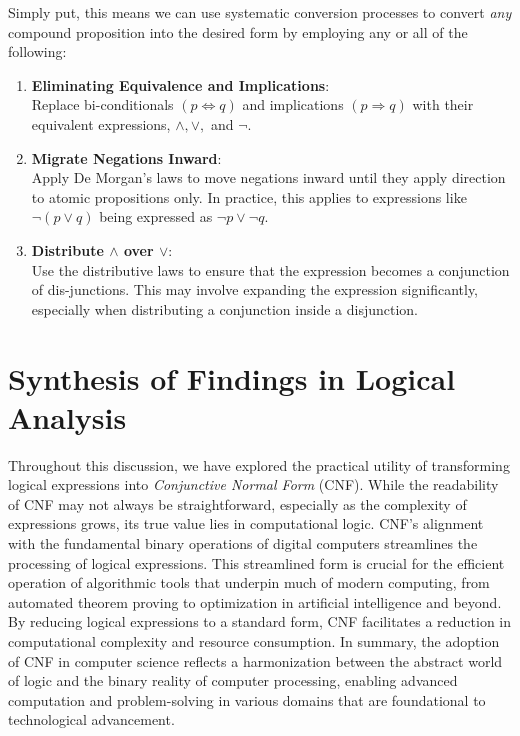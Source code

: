 \documentclass{article}
\begin{document}
            \noindent Simply put, this means we can use systematic conversion processes to convert \textit{any} compound proposition into the desired form by employing any or all of the following: 
            \begin{enumerate}
                \item \textbf{Eliminating Equivalence and Implications}: \\
                Replace bi-conditionals $(p\iff q)$ and implications $(p\Rightarrow q)$ with their equivalent expressions, $\land, \lor,$ and $\neg$. 
                \item \textbf{Migrate Negations Inward}: \\
                Apply De Morgan's laws to move negations inward until they apply direction to atomic propositions only. In practice, this applies to expressions like $\neg(p \lor q)$ being expressed as $\neg p \lor \neg q$. 
                \item \textbf{Distribute $\land$ over $\lor$}: \\
                Use the distributive laws to ensure that the expression becomes a conjunction of dis-junctions. This may involve expanding the expression significantly, especially when distributing a conjunction inside a disjunction.
            \end{enumerate}
        

    

\section{Synthesis of Findings in Logical Analysis}

Throughout this discussion, we have explored the practical utility of transforming logical expressions into \textit{Conjunctive Normal Form} (CNF). While the readability of CNF may not always be straightforward, especially as the complexity of expressions grows, its true value lies in computational logic. CNF's alignment with the fundamental binary operations of digital computers streamlines the processing of logical expressions. This streamlined form is crucial for the efficient operation of algorithmic tools that underpin much of modern computing, from automated theorem proving to optimization in artificial intelligence and beyond. \\

\noindent By reducing logical expressions to a standard form, CNF facilitates a reduction in computational complexity and resource consumption. In summary, the adoption of CNF in computer science reflects a harmonization between the abstract world of logic and the binary reality of computer processing, enabling advanced computation and problem-solving in various domains that are foundational to technological advancement.
        
\newpage

\end{document}
